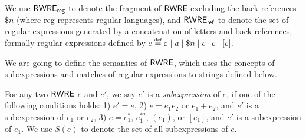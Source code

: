 We use ${\sf RWRE_{reg}}$ to denote the fragment of ${\sf RWRE}$ excluding the back references $\$ n$ (where {\sf reg} represents regular languages), and ${\sf RWRE_{ref}}$ to denote the set of regular expressions generated by a concatenation of letters and back references, formally regular expressions defined by $e \eqdef \varepsilon \mid a \mid \$n \mid e \concat e \mid [e]$.  
  
  

We are going to define the semantics of ${\sf RWRE}$, which uses the concepts of subexpressions and matches of regular expressions to strings defined below.
  
  
  	For any two ${\sf RWRE}$ $e$ and $e'$, we say $e'$ is a \emph{subexpression} of $e$,
  	if one of the following conditions holds: 1) $e'=e$, 2) $e = e_1 e_2$ or $e_1 + e_2$, and $e'$ is a subexpression of $e_1$ or $e_2$, 3) $e = e_1^{\ast}$, $e_1^{\ast?}$, $(e_1)$, or $[e_1]$, and $e'$ is a subexpression of $e_1$. We use $S (e)$ to denote the set of all subexpressions of $e$.
  
